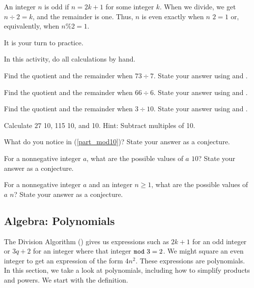 \begin{exam}
\begin{apart}
\begin{soln}
            An integer $n$ is odd if $n=2k+1$ for some integer $k$.  When we divide, we get $n \div 2 = k$, and the remainder is one. Thus, $n$ is even exactly when $n$  $2=1$ or, equivalently, when $n\%2=1$.
        \end{soln}
\end{apart}
\end{exam}

It is your turn to practice.

\begin{act}
\label{act_practice_div_mod}
In this activity, do all calculations by hand.  
    \begin{actpart}
        \item Find the quotient and the remainder when $73 \div 7$.  State your answer using  and .
        \item Find the quotient and the remainder when $66 \div 6$.  State your answer using  and .  
        \item Find the quotient and the remainder when $3 \div 10$.  State your answer using  and .  
        \item \label{part_mod10} Calculate 
        $27$  10, 115  10, and   10.  Hint: Subtract multiples of 10.  
        \item What do you notice in (\ref{part_mod10})?  State your answer as a conjecture.
        \item For a nonnegative integer $a$, what are the possible values of $a$  $10$?  State your answer as a conjecture.
        \item For a nonnegative integer $a$ and an integer $n \ge 1$, what are the possible values of $a$  $n$? State your answer as a conjecture.
    \end{actpart}
\end{act}

\newcommand{\subpolys}{Algebra: Polynomials}
\subsection{\subpolys}
\label{sub_polys}

The Division Algorithm () gives us expressions such as $2k+1$ for an odd integer or $3q+2$ for an integer where that integer $\texttt{mod}~ 3 = 2$. We might square an even integer to get an expression of the form $4n^2$. These expressions are polynomials. In this section, we take a look at polynomials, including how to simplify products and powers. We start with the definition. 


